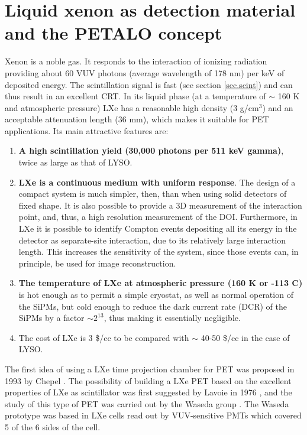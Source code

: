 \documentclass[review]{elsarticle}
\begin{document}
\section{Liquid xenon as detection material and the PETALO concept}
\label{sec.LXe}

Xenon is a noble gas. It responds to the interaction of ionizing radiation providing about 60 VUV photons (average wavelength of 178 nm) per keV of deposited energy. The scintillation signal is fast 
(see section \ref{sec.scint}) and can thus result in an excellent CRT.  In its liquid phase (at a temperature of $\sim$ 160 K and atmospheric pressure) LXe has a reasonable high density (3 g/cm$^3$) and an acceptable attenuation length (36 mm), which makes it suitable for PET applications. Its main attractive features are:

\begin{enumerate}
\item {\bf A high scintillation yield (30,000 photons per 511 keV gamma)}, twice as large as that of LYSO. 
\item {\bf LXe is a continuous medium with uniform response}. The design of a compact system is much simpler, then, than when using solid detectors of fixed shape. It is also possible to provide a 3D measurement of the interaction point, and, thus, a high resolution measurement of the DOI. Furthermore, in LXe it is possible to identify Compton events depositing all its energy in the detector as separate-site interaction, due to its relatively large interaction length. This increases the sensitivity of the system, since those events can, in principle, be used for image reconstruction. 
\item {\bf The temperature of LXe at atmospheric pressure (160 K or -113 C)} is hot enough as to permit a simple cryostat, as well as normal operation of the SiPMs, but cold enough to reduce the dark current rate (DCR) of the SiPMs by a factor $\sim 2^{13}$, thus making it essentially negligible. 
\item {The cost} of LXe is 3 \$/cc to be compared with $\sim$ 40-50 \$/cc in the case of LYSO. 
 \end{enumerate}

The first idea of using a LXe time projection chamber for PET was proposed in 1993 by Chepel \cite{chepelFirst}. 
The possibility of building a LXe PET based on the excellent properties of LXe as scintillator was first suggested by Lavoie in 1976 \cite{lavoie}, and the study of this type of PET was carried out by the Waseda group \cite{Doke1,Nishikido2,Nishikido1}. The Waseda prototype was based in LXe cells read out by VUV-sensitive PMTs which covered 5 of the 6 sides of the cell. 
\end{document}
